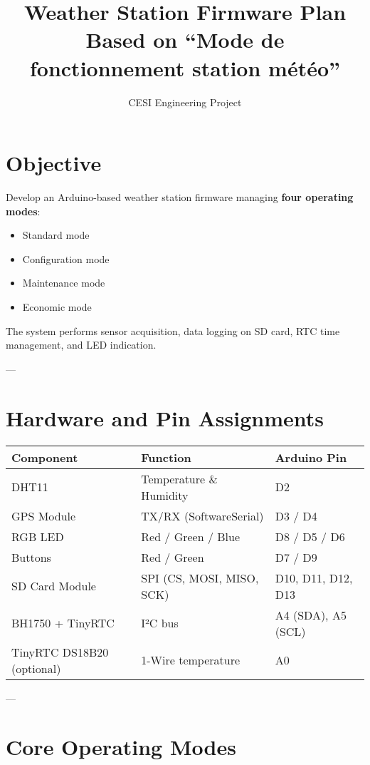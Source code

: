 \documentclass[a4paper,12pt]{article}
\title{\textbf{Weather Station Firmware Plan}\\Based on ``Mode de fonctionnement station météo''}
\author{CESI Engineering Project}
\date{}
\begin{document}
\maketitle

\tableofcontents
\newpage

\section{Objective}
Develop an Arduino-based weather station firmware managing \textbf{four operating modes}:
\begin{itemize}
  \item Standard mode
  \item Configuration mode
  \item Maintenance mode
  \item Economic mode
\end{itemize}

The system performs sensor acquisition, data logging on SD card, RTC time management, and LED indication.

---

\section{Hardware and Pin Assignments}

\begin{longtable}{|l|l|l|}
\hline
\textbf{Component} & \textbf{Function} & \textbf{Arduino Pin} \\ \hline
DHT11 & Temperature \& Humidity & D2 \\ \hline
GPS Module & TX/RX (SoftwareSerial) & D3 / D4 \\ \hline
RGB LED & Red / Green / Blue & D8 / D5 / D6 \\ \hline
Buttons & Red / Green & D7 / D9 \\ \hline
SD Card Module & SPI (CS, MOSI, MISO, SCK) & D10, D11, D12, D13 \\ \hline
BH1750 + TinyRTC & I²C bus & A4 (SDA), A5 (SCL) \\ \hline
TinyRTC DS18B20 (optional) & 1-Wire temperature & A0 \\ \hline
\end{longtable}

---

\section{Core Operating Modes}
\end{document}
